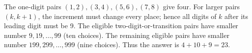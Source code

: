 The one-digit pairs $(1,2),(3,4),(5,6),(7,8)$ give four. For larger pairs $(k,k+1)$, the increment must change every place; hence all digits of $k$ after its leading digit must be 9. The eligible two-digit-or-transition pairs have smaller number $9,19,\ldots,99$ (ten choices). The remaining eligible pairs have smaller number $199,299,\ldots,999$ (nine choices). Thus the answer is $4+10+9=\boxed{23}$.
